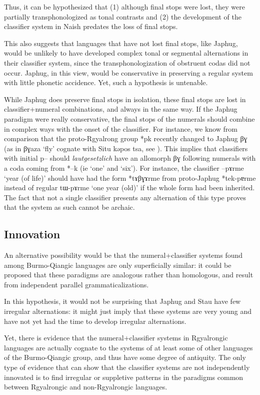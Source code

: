 \documentclass[oldfontcommands,oneside,a4paper,12pt]{article}
\newcommand{\ipa}[1]{{\phon#1}}
\begin{document}
Thus, it can be hypothesized that (1) although final stops were lost, they were partially transphonologized as tonal contrasts and (2) the development of the classifier system in Naish predates the loss of final stops.

This also suggests that languages that have not lost final stops, like Japhug, would be unlikely to have developed complex tonal or segmental alternations in their classifier system, since the transphonologization of obstruent codas  did not occur.  Japhug, in this view, would be conservative in preserving a regular system with little phonetic accidence. Yet, such a hypothesis is untenable.  

While Japhug does preserve final stops in isolation, these final stops are lost in classifier+numeral combinations, and always in the same way. If the Japhug paradigm were really conservative, the final stops of the numerals should combine in complex ways with the onset of the classifier. For instance, we know from comparison that the proto-Rgyalrong group *\ipa{pk} recently changed to Japhug \ipa{βɣ} (as in \ipa{βɣaza} `fly' cognate with Situ \ipa{kəpos tsa}, see \citealt[272]{jacques04these}). This implies that classifiers with initial \ipa{p--} should  \textit{lautgesetzlich} have an allomorph \ipa{βɣ} following numerals with a coda coming from *\ipa{--k} (ie `one' and `six').  For instance, the classifier \ipa{--pɤrme} `year (of life)'  should have had the form  *\ipa{tɤβɣɤrme} from proto-Japhug *\ipa{tek-pɐrme}  instead of regular \ipa{tɯ-pɤrme} `one year (old)' if the whole form had been inherited. The fact that not a single classifier presents any alternation of this type proves that the system as such cannot be archaic.



\subsection{Innovation}
An alternative possibility would be that the numeral+classifier systems found among Burmo-Qiangic languages are only superficially similar: it could be proposed that these paradigms are analogous rather than homologous, and result from independent parallel grammaticalizations.

In this hypothesis, it would not be surprising that Japhug and Stau have few irregular alternations: it might just imply that these systems are very young and have not yet had the time to develop irregular alternations.

Yet,  there is  evidence that the numeral+classifier systems in Rgyalrongic languages are actually cognate to the systems of at least some of other languages of the Burmo-Qiangic group, and thus have some degree of antiquity. The only type of evidence that can show that the classifier systems are not independently innovated is to find irregular or suppletive patterns in the paradigms common between Rgyalrongic and non-Rgyalrongic languages.
\end{document}
